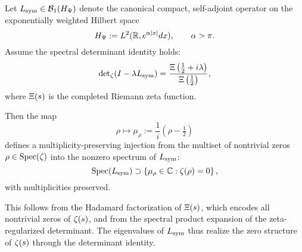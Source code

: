 \begin{lemma}
\label{lem:spectral_encoding_injection}

Let \( L_{\mathrm{sym}} \in \mathcal{B}_1(H_{\Psi}) \) denote the canonical compact, self-adjoint operator on the exponentially weighted Hilbert space
\[
H_{\Psi} := L^2(\mathbb{R}, e^{\alpha |x|} dx), \qquad \alpha > \pi.
\]
Assume the spectral determinant identity holds:
\[
\det\nolimits_{\zeta}(I - \lambda L_{\mathrm{sym}}) = \frac{\Xi\left( \tfrac{1}{2} + i\lambda \right)}{\Xi\left( \tfrac{1}{2} \right)},
\]
where \( \Xi(s) \) is the completed Riemann zeta function.

Then the map
\[
\rho \mapsto \mu_\rho := \frac{1}{i}(\rho - \tfrac{1}{2})
\]
defines a multiplicity-preserving injection from the multiset of nontrivial zeros \( \rho \in \operatorname{Spec}(\zeta) \) into the nonzero spectrum of \( L_{\mathrm{sym}} \):
\[
\operatorname{Spec}(L_{\mathrm{sym}}) \supset \left\{ \mu_\rho \in \mathbb{C} : \zeta(\rho) = 0 \right\},
\]
with multiplicities preserved.

\medskip

\noindent
This follows from the Hadamard factorization of \( \Xi(s) \), which encodes all nontrivial zeros of \( \zeta(s) \), and from the spectral product expansion of the zeta-regularized determinant. The eigenvalues of \( L_{\mathrm{sym}} \) thus realize the zero structure of \( \zeta(s) \) through the determinant identity.
\end{lemma}

